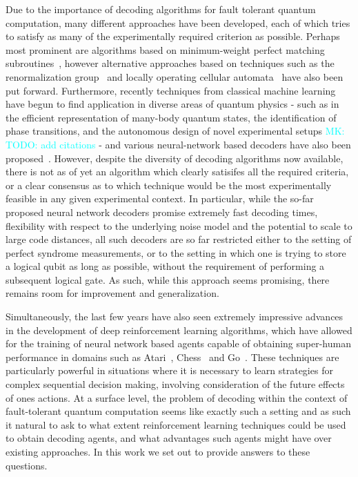 \documentclass[twocolumn,preprintnumbers,amsmath,amssymb,notitlepage,nofootinbib,longbibliography,superscriptaddress,aps,pra,10pt]{revtex4-1}
\newcommand{\mk}[1]{\textcolor{Cyan}{MK: #1}}
\begin{document}
	Due to the importance of decoding algorithms for fault tolerant quantum computation, many different approaches have been developed, each of which tries to satisfy as many of the experimentally required criterion as possible.
	Perhaps most prominent are algorithms based on minimum-weight perfect matching subroutines~\cite{Fowler13}, however alternative approaches based on techniques such as the renormalization group~\cite{Duclos2010} and locally operating cellular automata~\cite{Herold15} have also been put forward.
	Furthermore, recently techniques from classical machine learning have begun to find application in diverse areas of quantum physics - such as in the efficient representation of many-body quantum states, the identification of phase transitions, and the autonomous design of novel experimental setups \mk{TODO: add citations} - and various neural-network based decoders have also been proposed~\cite{Torlai10, Varsamopoulos17, Krastanov17, Breuckmann18, Baireuther18a, Baireuther18b, Ni18}.
	However, despite the diversity of decoding algorithms now available, there is not as of yet an algorithm which clearly satisifes all the required criteria, or a clear consensus as to which technique would be the most experimentally feasible in any given experimental context.
	In particular, while the so-far proposed neural network decoders promise extremely fast decoding times, flexibility with respect to the underlying noise model and the potential to scale to large code distances, all such decoders are so far restricted either to the setting of perfect syndrome measurements, or to the setting in which one is trying to store a logical qubit as long as possible, without the requirement of performing a subsequent logical gate.
	As such, while this approach seems promising, there remains room for improvement and generalization.

	Simultaneously, the last few years have also seen extremely impressive advances in the development of deep reinforcement learning algorithms, which have allowed for the training of neural network based agents capable of obtaining super-human performance in domains such as Atari~\cite{Mnih15}, Chess~\cite{Silver17a} and Go~\cite{Silver17b}.
	These techniques are particularly powerful in situations where it is necessary to learn strategies for complex sequential decision making, involving consideration of the future effects of ones actions.
	At a surface level, the problem of decoding within the context of fault-tolerant quantum computation seems like exactly such a setting and as such it natural to ask to what extent reinforcement learning techniques could be used to obtain decoding agents, and what advantages such agents might have over existing approaches.
	In this work we set out to provide answers to these questions.
\end{document}

